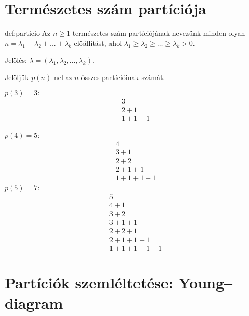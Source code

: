 \section*{Természetes szám partíciója}
\begin{definition}{def:particio}
Az $n\geq1$ természetes szám partíciójának nevezünk minden olyan
$n=\lambda_{1}+\lambda_{2}+...+\lambda_{k}$ előállítást, ahol $\lambda_{1}\geq\lambda_{2}\geq\dots\geq\lambda_{k}>0$.\par Jelölés:
$\lambda=(\lambda_{1},\lambda_{2},...,\lambda_{k})$.
\end{definition}
Jelöljük $p(n)$-nel az $n$ összes partícióinak számát. 
\begin{example}
\begin{multicols}{3} $p(3)=3:$ 
\begin{align*}
 & 3\\
 & 2+1\\
 & 1+1+1
\end{align*}
\par $p(4)=5$: 
\begin{align*}
 & 4\\
 & 3+1\\
 & 2+2\\
 & 2+1+1\\
 & 1+1+1+1
\end{align*}
$p(5)=7$: 
\begin{align*}
 & 5\\
 & 4+1\\
 & 3+2\\
 & 3+1+1\\
 & 2+2+1\\
 & 2+1+1+1\\
 & 1+1+1+1+1
\end{align*}
\end{multicols}
\end{example}

\section*{Partíciók szemléltetése: Young--diagram}


